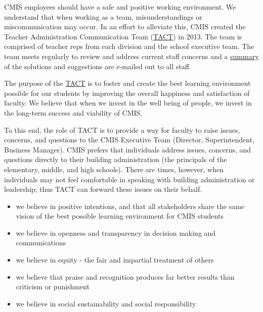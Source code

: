 
CMIS employees should have a safe and positive working environment. We understand that when working as a team, misunderstandings or miscommunication may occur.  In an effort to alleviate this, CMIS created the Teacher Administration Communication Team (\href{https://docs.google.com/a/cmis.ac.th/document/d/14nhwcw8xo3i-23Q-WUxo6KJ_c8yFKu-jTdCctt4MFcs/edit?usp=sharing}{TACT}) in 2013. The team is comprised of teacher reps from each division and the school executive team. The team meets regularly to review and address current staff concerns and a \href{https://docs.google.com/a/cmis.ac.th/document/d/1KLB4c5_LkxXzq4vP2EuNhBVPp2q_FT9qy1cBBwaS5JM/edit?usp=sharing}{summary} of the solutions and suggestions are e-mailed out to all staff.

The purpose of the \href{https://docs.google.com/document/d/12ZwL4geAPTDcm-SI6U1fRpXEKxKZ-61q54upcikt6lc/edit}{TACT} is to foster and create the best learning environment possible for our students by improving the overall happiness and satisfaction of faculty. We believe that when we invest in the well being of people, we invest in the long-term success and viability of CMIS.

To this end, the role of TACT is to provide a way for faculty to raise issues, concerns, and questions to the CMIS Executive Team (Director, Superintendent, Business Manager).  CMIS prefers that individuals address issues, concerns, and questions directly to their building administration (the principals of the elementary, middle, and high schools).  There are times, however, when individuals may not feel comfortable in speaking with building administration or leadership; thus TACT can forward these issues on their behalf.

\begin{itemize}
\item we believe in positive intentions, and that all stakeholders share the same vision of the best possible learning environment for CMIS students
\item we believe in openness and transparency in decision making and communications
\item we believe in equity - the fair and impartial treatment of others
\item we believe that praise and recognition produces far better results than criticism or punishment
\item we believe in social sustainability and social responsibility
\end{itemize}

